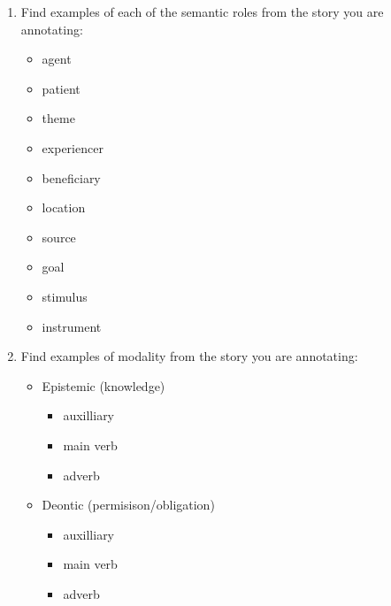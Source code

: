 \documentclass[a4paper]{article}
\begin{document}
\begin{enumerate}
\item Find examples of each of the semantic roles from the story you are annotating:
  \begin{itemize}
  \item agent
  \item patient
  \item theme
  \item experiencer
  \item beneficiary
  \item location
  \item source
  \item goal
  \item stimulus
  \item instrument
  \end{itemize}
\item Find examples of modality from the story you are annotating:
  \begin{itemize}
  \item Epistemic (knowledge)
    \begin{itemize}
    \item auxilliary
    \item main verb
    \item adverb
    \end{itemize}
  \item Deontic (permisison/obligation)
    \begin{itemize}
    \item auxilliary
    \item main verb
    \item adverb
    \end{itemize}
  \end{itemize}
\end{enumerate}
\end{document}
